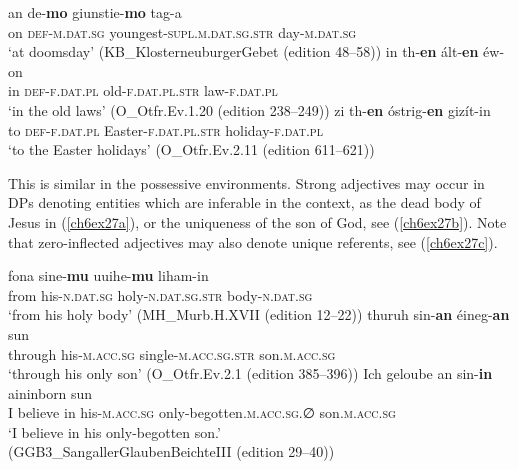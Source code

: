 \documentclass[output=paper,colorlinks,citecolor=brown]{langscibook}
\begin{document}
\begin{exe}
\ex\label{ch6ex26}\begin{xlist}
\ex\label{ch6ex26a}
\gll an de-\textbf{mo} giunstie-\textbf{mo} tag-a  \\
on \textsc{def-m.dat.sg} youngest-\textsc{supl.m.dat.sg.str} day-\textsc{m.dat.sg}\\
\glt `at doomsday' (KB\_KlosterneuburgerGebet (edition 48--58))
\ex\label{ch6ex26b} 
\gll in th-\textbf{en} ált-\textbf{en } éw-on\\
in \textsc{def-f.dat.pl} old-\textsc{f.dat.pl.str} law-\textsc{f.dat.pl}\\
\glt `in the old laws' (O\_Otfr.Ev.1.20 (edition 238--249))
\ex\label{ch6ex26c} 
\gll zi th-\textbf{en} óstrig-\textbf{en} gizít-in\\
to \textsc{def-f.dat.pl} Easter-\textsc{f.dat.pl.str} holiday-\textsc{f.dat.pl}\\
\glt `to the Easter holidays' (O\_Otfr.Ev.2.11 (edition 611--621))
\end{xlist}
\end{exe}

This is similar in the possessive environments. Strong adjectives may
occur in DPs denoting entities which are inferable in the context, as
the dead body of Jesus in (\ref{ch6ex27a}), or the uniqueness of the son of God,
see (\ref{ch6ex27b}). Note that zero-inflected adjectives may also denote unique
referents, see (\ref{ch6ex27c}).

\begin{exe}
\ex\label{ch6ex27}\begin{xlist}
\ex\label{ch6ex27a}
\gll fona  sine-\textbf{mu } uuihe-\textbf{mu} liham-in\\
from his-\textsc{n.dat.sg} holy-\textsc{n.dat.sg.str} body-\textsc{n.dat.sg}\\
\glt `from his holy body' (MH\_Murb.H.XVII (edition 12--22))
\ex\label{ch6ex27b} 
\gll thuruh sin-\textbf{an} éineg-\textbf{an} sun\\
through his-\textsc{m.acc.sg} single-\textsc{m.acc.sg.str} son.\textsc{m.acc.sg}\\
\glt `through his only son' (O\_Otfr.Ev.2.1 (edition 385--396))
\ex\label{ch6ex27c} 
\gll Ich geloube an sin-\textbf{in} aininborn sun\\
I believe in his-\textsc{m.acc.sg} only-begotten.\textsc{m.acc.sg.∅} son.\textsc{m.acc.sg}\\
\glt `I believe in his only-begotten son.'\\(GGB3\_SangallerGlaubenBeichteIII (edition 29--40))
\end{xlist}
\end{exe}
\end{document}
